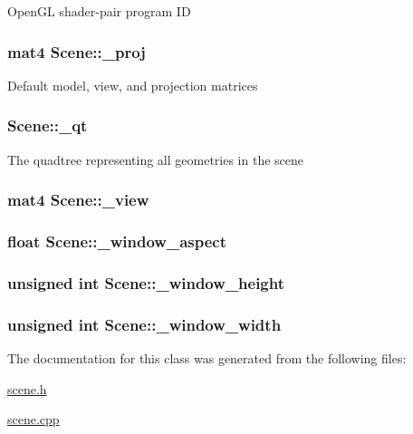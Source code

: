 Open\+G\+L shader-\/pair program I\+D \hypertarget{class_scene_a7e980fe501bcaf6f173497d0a2190887}{
\subsubsection[{\+\_\+proj}]{\setlength{\rightskip}{0pt plus 5cm}mat4 Scene\+::\+\_\+proj}}\label{class_scene_a7e980fe501bcaf6f173497d0a2190887}
Default model, view, and projection matrices \hypertarget{class_scene_af49afd50369f23c12d70c6fe07c9b797}{
\subsubsection[{\+\_\+qt}]{ Scene\+::\+\_\+qt}}\label{class_scene_af49afd50369f23c12d70c6fe07c9b797}
The quadtree representing all geometries in the scene \hypertarget{class_scene_ae1b9af3642d66e6eff7d849c20aafdc5}{
\subsubsection[{\+\_\+view}]{\setlength{\rightskip}{0pt plus 5cm}mat4 Scene\+::\+\_\+view}}\label{class_scene_ae1b9af3642d66e6eff7d849c20aafdc5}
\hypertarget{class_scene_aa5d5f322f50e6518e88501fa5481eca9}{
\subsubsection[{\+\_\+window\+\_\+aspect}]{\setlength{\rightskip}{0pt plus 5cm}float Scene\+::\+\_\+window\+\_\+aspect}}\label{class_scene_aa5d5f322f50e6518e88501fa5481eca9}
\hypertarget{class_scene_a4a9a7b4b69981efd9ffddfb7d4205806}{
\subsubsection[{\+\_\+window\+\_\+height}]{\setlength{\rightskip}{0pt plus 5cm}unsigned int Scene\+::\+\_\+window\+\_\+height}}\label{class_scene_a4a9a7b4b69981efd9ffddfb7d4205806}
\hypertarget{class_scene_a9857688fb9c3a52be5e6b7551d7e3af8}{
\subsubsection[{\+\_\+window\+\_\+width}]{\setlength{\rightskip}{0pt plus 5cm}unsigned int Scene\+::\+\_\+window\+\_\+width}}\label{class_scene_a9857688fb9c3a52be5e6b7551d7e3af8}


The documentation for this class was generated from the following files\+:\begin{DoxyCompactItemize}
\item 
\hyperlink{scene_8h}{scene.\+h}\item 
\hyperlink{scene_8cpp}{scene.\+cpp}\end{DoxyCompactItemize}
